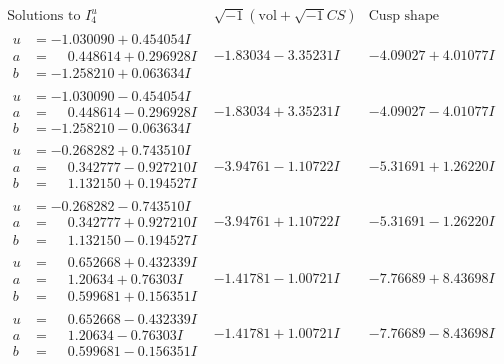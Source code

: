 \documentclass[1p]{elsarticle_modified}
\theoremstyle{definition}
\newcommand{\I}{\sqrt{-1}}
\begin{document}
$$\begin{array}{c|c|c}  
\text{Solutions to }I^u_{4}& \I (\text{vol} + \sqrt{-1}CS) & \text{Cusp shape}\\
 \hline 
\begin{aligned}
u &= -1.030090 + 0.454054 I \\
a &= \phantom{-}0.448614 + 0.296928 I \\
b &= -1.258210 + 0.063634 I\end{aligned}
 & -1.83034 - 3.35231 I & -4.09027 + 4.01077 I \\ \hline\begin{aligned}
u &= -1.030090 - 0.454054 I \\
a &= \phantom{-}0.448614 - 0.296928 I \\
b &= -1.258210 - 0.063634 I\end{aligned}
 & -1.83034 + 3.35231 I & -4.09027 - 4.01077 I \\ \hline\begin{aligned}
u &= -0.268282 + 0.743510 I \\
a &= \phantom{-}0.342777 - 0.927210 I \\
b &= \phantom{-}1.132150 + 0.194527 I\end{aligned}
 & -3.94761 - 1.10722 I & -5.31691 + 1.26220 I \\ \hline\begin{aligned}
u &= -0.268282 - 0.743510 I \\
a &= \phantom{-}0.342777 + 0.927210 I \\
b &= \phantom{-}1.132150 - 0.194527 I\end{aligned}
 & -3.94761 + 1.10722 I & -5.31691 - 1.26220 I \\ \hline\begin{aligned}
u &= \phantom{-}0.652668 + 0.432339 I \\
a &= \phantom{-}1.20634 + 0.76303 I \\
b &= \phantom{-}0.599681 + 0.156351 I\end{aligned}
 & -1.41781 - 1.00721 I & -7.76689 + 8.43698 I \\ \hline\begin{aligned}
u &= \phantom{-}0.652668 - 0.432339 I \\
a &= \phantom{-}1.20634 - 0.76303 I \\
b &= \phantom{-}0.599681 - 0.156351 I\end{aligned}
 & -1.41781 + 1.00721 I & -7.76689 - 8.43698 I \\ \hline\begin{aligned}

\end{aligned}
\end{array}$$
\end{document}

